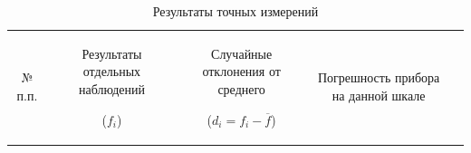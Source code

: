 \begin{center}
\begin{table}[h!]
\centering
\caption{Результаты точных измерений}
\label{tabl:1}
\begin{tabular}{|c|c|c|c|c|}
\hline
\begin{minipage}{7mm}
    № п.п. 
\end{minipage}&
\begin{minipage}{5cm}
    Результаты отдельных наблюдений 
    
    ($f_i$)
\end{minipage} &
\begin{minipage}{5cm}
    Случайные отклонения от среднего
    
    ($d_i = f_i - \overline{f}$)
\end{minipage} &
\begin{minipage}{5cm}
    Погрешность прибора на данной шкале
    

\end{minipage}
\end{tabular}
\end{table}
\end{center}
